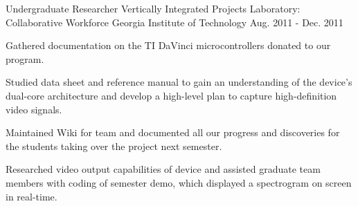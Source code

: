 

\begin{cventries}

  \cventry
    {Undergraduate Researcher} %
    {Vertically Integrated Projects Laboratory: Collaborative Workforce } %
    {Georgia Institute of Technology} %
    {Aug. 2011 - Dec. 2011} %
    {
      \begin{cvitems} %
        \item {Gathered documentation on the TI DaVinci microcontrollers donated to our program.}
        \item {Studied data sheet and reference manual to gain an understanding of the device's dual-core architecture and develop a high-level plan to capture high-definition video signals.}
        \item {Maintained Wiki for team and documented all our progress and discoveries for the students taking over the project next semester.}
        \item {Researched video output capabilities of device and assisted graduate team members with coding of semester demo, which displayed a spectrogram on screen in real-time.}
      \end{cvitems}
    }
\end{cventries}
